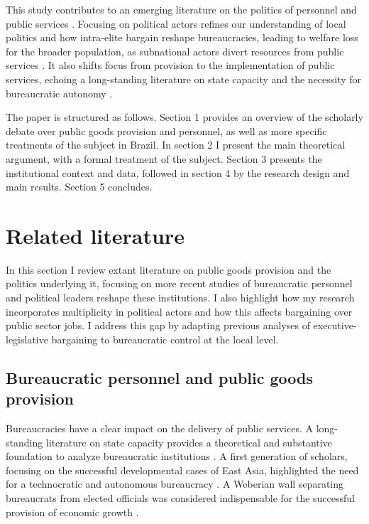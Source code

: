 \documentclass[12pt,a4paper]{article}
\begin{document}
This study contributes to an emerging literature on the politics of personnel and public services \citep{pepinsky_bureaucracy_2017, finan_personnel_2015, gulzar_politicians_2017}. Focusing on political actors refines our understanding of local politics and how intra-elite bargain reshape bureaucracies, leading to welfare loss for the broader population, as subnational actors divert resources from public services \citep{ferraz_corrupting_2012}. It also shifts focus from provision to the implementation of public services, echoing a long-standing literature on state capacity and the necessity for bureaucratic autonomy \citep{kohli_state-directed_2004, evans_embedded_1995}.

The paper is structured as follows. Section 1 provides an overview of the scholarly debate over public goods provision and personnel, as well as more specific treatments of the subject in Brazil. In section 2 I present the main theoretical argument, with a formal treatment of the subject. Section 3 presents the institutional context and data, followed in section 4 by the research design and main results. Section 5 concludes.

\section{Related literature}

In this section I review extant literature on public goods provision and the politics underlying it, focusing on more recent studies of bureaucratic personnel and political leaders reshape these institutions. I also highlight how my research incorporates multiplicity in political actors and how this affects bargaining over public sector jobs. I address this gap by adapting previous analyses of executive-legislative bargaining to bureaucratic control at the local level.

\subsection*{Bureaucratic personnel and public goods provision}

Bureaucracies have a clear impact on the delivery of public services. A long-standing literature on state capacity provides a theoretical and substantive foundation to analyze bureaucratic institutions \citep{centeno_unpacking_2017, kohli_state-directed_2004}. A first generation of scholars, focusing on the successful developmental cases of East Asia, highlighted the need for a technocratic and autonomous bureaucracy \citep{johnson_miti_1982, kohli_state-directed_2004}. A Weberian wall separating bureaucrats from elected officials was considered indispensable for the successful provision of economic growth \citep{evans_bureaucracy_1999}.
\end{document}
